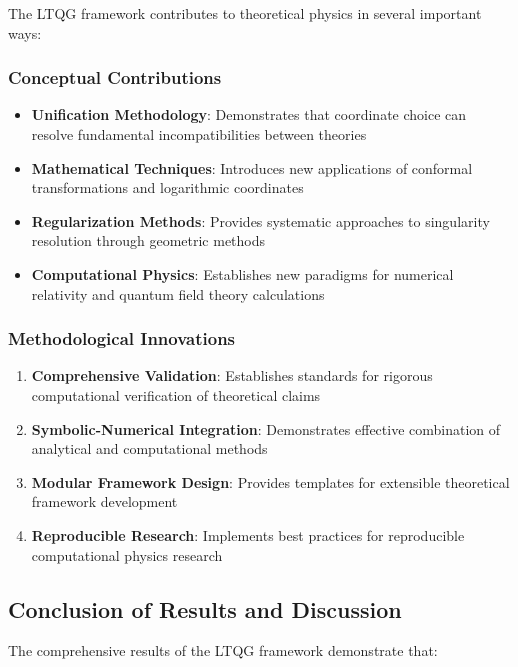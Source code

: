 The LTQG framework contributes to theoretical physics in several important ways:

\subsubsection{Conceptual Contributions}

\begin{itemize}
\item \textbf{Unification Methodology}: Demonstrates that coordinate choice can resolve fundamental incompatibilities between theories
\item \textbf{Mathematical Techniques}: Introduces new applications of conformal transformations and logarithmic coordinates
\item \textbf{Regularization Methods}: Provides systematic approaches to singularity resolution through geometric methods
\item \textbf{Computational Physics}: Establishes new paradigms for numerical relativity and quantum field theory calculations
\end{itemize}

\subsubsection{Methodological Innovations}

\begin{enumerate}
\item \textbf{Comprehensive Validation}: Establishes standards for rigorous computational verification of theoretical claims
\item \textbf{Symbolic-Numerical Integration}: Demonstrates effective combination of analytical and computational methods
\item \textbf{Modular Framework Design}: Provides templates for extensible theoretical framework development
\item \textbf{Reproducible Research}: Implements best practices for reproducible computational physics research
\end{enumerate}

\subsection{Conclusion of Results and Discussion}

The comprehensive results of the LTQG framework demonstrate that:


